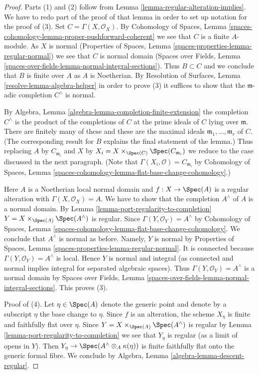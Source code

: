 \begin{proof}
Parts (1) and (2) follow from Lemma \ref{lemma-regular-alteration-implies}.
We have to redo part of the proof of that lemma in order to set up notation
for the proof of (3). Set $C = \Gamma(X, \mathcal{O}_X)$. By
Cohomology of Spaces, Lemma
\ref{spaces-cohomology-lemma-proper-pushforward-coherent}
we see that $C$ is a finite $A$-module.
As $X$ is normal
(Properties of Spaces, Lemma
\ref{spaces-properties-lemma-regular-normal})
we see that $C$ is normal domain
(Spaces over Fields, Lemma
\ref{spaces-over-fields-lemma-normal-integral-sections}).
Thus $B \subset C$ and we conclude that $B$ is finite over $A$
as $A$ is Noetherian. By
Resolution of Surfaces, Lemma \ref{resolve-lemma-algebra-helper}
in order to prove (3) it suffices to show
that the $\mathfrak m$-adic completion $C^\wedge$ is normal.

\medskip\noindent
By Algebra, Lemma \ref{algebra-lemma-completion-finite-extension}
the completion $C^\wedge$ is the product of the completions of
$C$ at the prime ideals of $C$ lying over $\mathfrak m$.
There are finitely many of these and these are the maximal
ideals $\mathfrak m_1, \ldots, \mathfrak m_r$ of $C$.
(The corresponding result for $B$ explains the final statement of the lemma.)
Thus replacing $A$ by $C_{\mathfrak m_i}$ and $X$ by
$X_i = X \times_{\Spec(C)} \Spec(C_{\mathfrak m_i})$
we reduce to the case discussed in the next paragraph.
(Note that $\Gamma(X_i, \mathcal{O}) = C_{\mathfrak m_i}$ by
Cohomology of Spaces,
Lemma \ref{spaces-cohomology-lemma-flat-base-change-cohomology}.)

\medskip\noindent
Here $A$ is a Noetherian local normal domain and $f : X \to \Spec(A)$
is a regular alteration with $\Gamma(X, \mathcal{O}_X) = A$.
We have to show that the completion $A^\wedge$
of $A$ is a normal domain. By
Lemma \ref{lemma-port-regularity-to-completion}
$Y = X \times_{\Spec(A)} \Spec(A^\wedge)$ is regular.
Since $\Gamma(Y, \mathcal{O}_Y) = A^\wedge$
by Cohomology of Spaces,
Lemma \ref{spaces-cohomology-lemma-flat-base-change-cohomology}.
We conclude that $A^\wedge$ is normal as before.
Namely, $Y$ is normal by Properties of Spaces, Lemma
\ref{spaces-properties-lemma-regular-normal}.
It is connected because $\Gamma(Y, \mathcal{O}_Y) = A^\wedge$ is local.
Hence $Y$ is normal and integral (as connected and normal
implies integral for separated algebraic spaces). Thus
$\Gamma(Y, \mathcal{O}_Y) = A^\wedge$ is a normal domain by
Spaces over Fields, Lemma
\ref{spaces-over-fields-lemma-normal-integral-sections}.
This proves (3).

\medskip\noindent
Proof of (4). Let $\eta \in \Spec(A)$ denote the generic point
and denote by a subscript $\eta$ the base change to $\eta$.
Since $f$ is an alteration, the scheme $X_\eta$ is finite and
faithfully flat over $\eta$. Since $Y = X \times_{\Spec(A)} \Spec(A^\wedge)$
is regular by Lemma \ref{lemma-port-regularity-to-completion}
we see that $Y_\eta$ is regular (as a limit of opens in $Y$).
Then $Y_\eta \to \Spec(A^\wedge \otimes_A \kappa(\eta))$ is finite
faithfully flat onto the generic formal fibre. We conclude by
Algebra, Lemma \ref{algebra-lemma-descent-regular}.
\end{proof}
